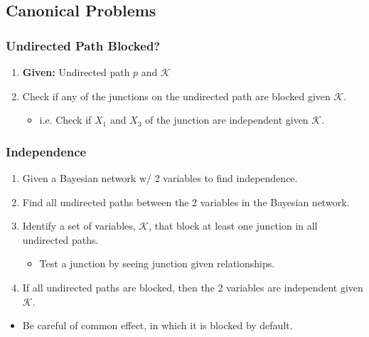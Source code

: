 \subsection{Canonical Problems}
\subsubsection{Undirected Path Blocked?}
\begin{process}
    \begin{enumerate}
        \item \textbf{Given:} Undirected path $p$ and $\mathcal{K}$
        \item Check if any of the junctions on the undirected path are blocked given $\mathcal{K}$.
        \begin{itemize}
            \item i.e. Check if $X_1$ and $X_3$ of the junction are independent given $\mathcal{K}$.
        \end{itemize}
    \end{enumerate}
\end{process}

\subsubsection{Independence}
\begin{process}
    \begin{enumerate}
        \item Given a Bayesian network w/ 2 variables to find independence.
        \item Find all undirected paths between the 2 variables in the Bayesian network.
        \item Identify a set of variables, $\mathcal{K}$, that block at least one junction in all undirected paths.
        \begin{itemize}
            \item Test a junction by seeing junction given relationships. 
        \end{itemize}
        \item If all undirected paths are blocked, then the 2 variables are independent given $\mathcal{K}$.
    \end{enumerate}
\end{process}

\begin{warning}
    \begin{itemize}
        \item Be careful of common effect, in which it is blocked by default. 
    \end{itemize}
\end{warning}


